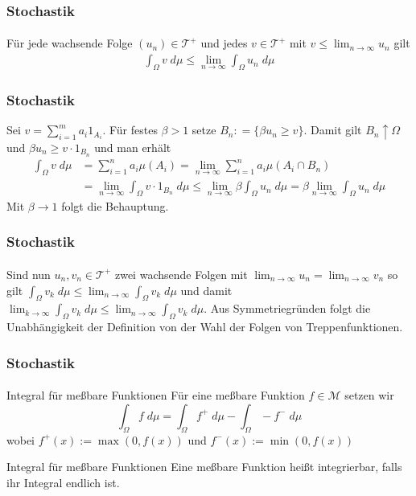 \documentclass{beamer}
\begin{document}
\begin{frame}
    \frametitle{Stochastik}
\framesubtitle{}
    \begin{block}{}
        Für jede wachsende Folge $(u_n) \in \mathcal{T}^+$ und jedes $v \in \mathcal{T}^+$ mit $v \leq \lim_{n \to \infty} u_n$ gilt
        \begin{align*}
            \int_{\Omega} v \;  d \mu \leq \lim_{n \to \infty} \int_{\Omega} u_n \; d \mu  
        \end{align*}
    \end{block}

\end{frame}


\begin{frame}
    \frametitle{Stochastik}
    Sei $v = \sum_{i=1}^{m} a_i 1_{A_i}$.  
    Für festes $\beta > 1$ setze $B_n: = \{\beta u_n \geq v \}$.
    Damit gilt $B_n \uparrow \Omega$ und $\beta u_n \geq v \cdot 1_{B_n}$ und man erhält
    \begin{align*}
        \int_{\Omega} v \;  d \mu & = \sum_{i=1}^n a_i \mu (A_i) = \lim_{n \to \infty} \sum_{i=1}^n a_i \mu (A_i \cap B_n) \\
        & = \lim_{n \to \infty} \int_{\Omega} v \cdot 1_{B_n}\;  d \mu
        \leq \lim_{n \to \infty} \beta \int_{\Omega} u_n \;  d \mu = \beta \lim_{n \to \infty} \int_{\Omega} u_n \;  d \mu
    \end{align*}
    Mit $\beta \to 1$ folgt die Behauptung.
\framesubtitle{}
\end{frame}


\begin{frame}
    \frametitle{Stochastik}
\framesubtitle{}
         Sind nun $u_n, v_n \in \mathcal{T}^+$ zwei wachsende Folgen mit
          $\lim_{n \to \infty} u_n = \lim_{n \to \infty} v_n$ so gilt
          $\int_{\Omega} v_k \; d \mu \leq \lim_{n \to \infty} \int_{\Omega} v_k \; d \mu$ und damit 
          $\lim_{k \to \infty} \int_{\Omega} v_k \; d \mu  \leq \lim_{n \to \infty} \int_{\Omega} v_k \; d \mu$. 
          Aus Symmetriegründen folgt die Unabhängigkeit der Definition von der Wahl der Folgen von Treppenfunktionen.
\end{frame}



\begin{frame}
    \frametitle{Stochastik}
\framesubtitle{}
    \begin{block}{Integral für meßbare Funktionen}
        Für eine meßbare Funktion  $f \in \mathcal{M}$ setzen wir
        $$ \int_{\Omega} f \; d\mu = \int_{\Omega}f^+ \; d\mu  - \int_{\Omega}-f^- \; d\mu$$
        wobei $f^+(x) := \max (0, f(x))$ und $f^-(x) := \min (0, f(x))$
    \end{block}

    \begin{block}{Integral für meßbare Funktionen}
       Eine meßbare Funktion heißt integrierbar, falls ihr Integral endlich ist.
    \end{block}

\end{frame}
\end{document}

